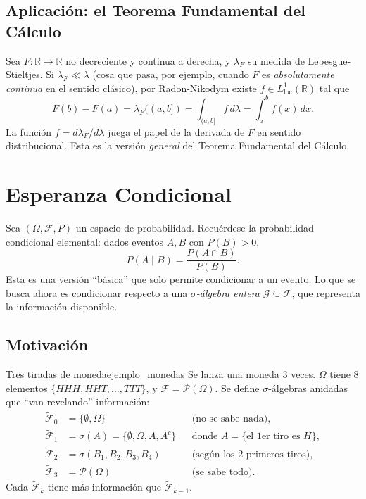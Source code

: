 \documentclass[11pt, a4paper]{article}
\begin{document}
\subsection{Aplicación: el Teorema Fundamental del Cálculo}

Sea $F: \mathbb{R} \to \mathbb{R}$ no decreciente y continua a derecha, y $\lambda_F$ su medida de
Lebesgue-Stieltjes. Si $\lambda_F \ll \lambda$ (cosa que pasa, por ejemplo, cuando $F$ es
\emph{absolutamente continua} en el sentido clásico), por Radon-Nikodym existe
$f \in L^1_{\mathrm{loc}}(\mathbb{R})$ tal que
$$ F(b) - F(a) = \lambda_F((a, b]) = \int_{(a, b]} f \, d\lambda = \int_a^b f(x) \, dx. $$
La función $f = d\lambda_F / d\lambda$ juega el papel de la derivada de $F$ en sentido
distribucional. Esta es la versión \emph{general} del Teorema Fundamental del Cálculo.

\newpage

\section{Esperanza Condicional}

Sea $(\Omega, \mathcal{F}, P)$ un espacio de probabilidad. Recuérdese la probabilidad condicional
elemental: dados eventos $A, B$ con $P(B) > 0$,
$$ P(A \mid B) = \frac{P(A \cap B)}{P(B)}. $$
Esta es una versión ``básica'' que solo permite condicionar a un evento. Lo que se busca ahora
es condicionar respecto a una \emph{$\sigma$-álgebra entera} $\mathcal{G} \subseteq \mathcal{F}$,
que representa la información disponible.

\subsection{Motivación}

\begin{ejemplo}{Tres tiradas de moneda}{ejemplo_monedas}
Se lanza una moneda 3 veces. $\Omega$ tiene 8 elementos $\{HHH, HHT, \dots, TTT\}$, y $\mathcal{F}
= \mathcal{P}(\Omega)$. Se define $\sigma$-álgebras anidadas que ``van revelando''
información:
\begin{align*}
\widetilde{\mathcal{F}}_0 &= \{\emptyset, \Omega\} && \text{(no se sabe nada)}, \\
\widetilde{\mathcal{F}}_1 &= \sigma(A) = \{\emptyset, \Omega, A, A^c\} && \text{donde } A
= \{\text{el 1er tiro es }H\}, \\
\widetilde{\mathcal{F}}_2 &= \sigma(B_1, B_2, B_3, B_4) && \text{(según los 2 primeros tiros)}, \\
\widetilde{\mathcal{F}}_3 &= \mathcal{P}(\Omega) && \text{(se sabe todo)}.
\end{align*}
Cada $\widetilde{\mathcal{F}}_k$ tiene más información que $\widetilde{\mathcal{F}}_{k-1}$.
\end{ejemplo}
\end{document}

